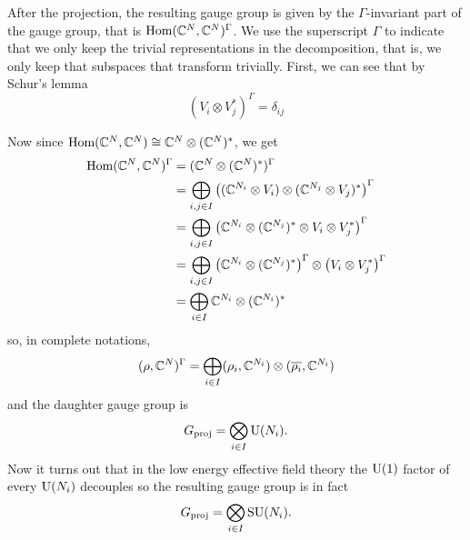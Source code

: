         After the projection, the resulting gauge group is given by the $\Gamma$-invariant part of the gauge group, that is $\text{Hom}(\mathbb{C}^N,\mathbb{C}^N)^\Gamma$. We use the superscript $\Gamma$ to indicate that we only keep the trivial representations in the decomposition, that is, we only keep that subspaces that transform trivially. First, we can see that by Schur's lemma 
        \begin{equation}
            (V_i\otimes V^*_j)^\Gamma=\delta_{ij}
        \end{equation}
        
        Now since $\text{Hom}(\mathbb{C}^N,\mathbb{C}^N)\cong\mathbb{C}^N\otimes(\mathbb{C}^N)^*$, we get
        \begin{align}
            \text{Hom}(\mathbb{C}^N,\mathbb{C}^N)^\Gamma &= (\mathbb{C}^N\otimes(\mathbb{C}^N)^*)^\Gamma\\
            &= \bigoplus_{i,j\in I} \left((\mathbb{C}^{N_i}\otimes V_i)\otimes(\mathbb{C}^{N_j}\otimes V_j)^*\right)^\Gamma\\
            &= \bigoplus_{i,j\in I} \left(\mathbb{C}^{N_i}\otimes(\mathbb{C}^{N_j})^*\otimes V_i\otimes V^*_j\right)^\Gamma\\
            &= \bigoplus_{i,j\in I} \left(\mathbb{C}^{N_i}\otimes(\mathbb{C}^{N_j})^*\right)^\Gamma\otimes\left(V_i\otimes V^*_j\right)^\Gamma\\
            &= \bigoplus_{i\in I}\mathbb{C}^{N_i}\otimes(\mathbb{C}^{N_i})^*
        \end{align}
        so, in complete notations,
        \begin{equation}
            (\rho,\mathbb{C}^N)^\Gamma = \bigoplus_{i\in I}(\rho_i,\mathbb{C}^{N_i})\otimes(\overline{\rho_i},\mathbb{C}^{N_i})
        \end{equation}
        and the daughter gauge group is
        \begin{equation}
            G_{\text{proj}} = \bigotimes_{i\in I}\text{U}(N_i).
        \end{equation}
        Now it turns out that in the low energy effective field theory the $\text{U}(1)$ factor of every $\text{U}(N_i)$ decouples  so the resulting gauge group is in fact
        \begin{equation}
            G_{\text{proj}} = \bigotimes_{i\in I}\text{SU}(N_i).
        \end{equation}

